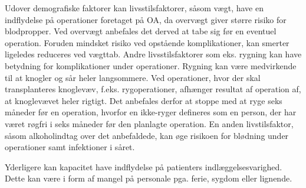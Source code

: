 Udover demografiske faktorer kan livsstilsfaktorer, såsom vægt, have en indflydelse på
operationer foretaget på OA, da overvægt giver større risiko
for blodpropper\cite{Ermonds2004}. Ved overvægt anbefales det derved at tabe sig før
en eventuel operation. Foruden mindsket risiko ved opstående komplikationer, kan
smerter ligeledes reduceres ved vægttab.
Andre livsstilsfaktorer som eks. rygning kan have betydning
for komplikationer under operationer. Rygning kan være medvirkende til at knogler
og sår heler langsommere. Ved operationer, hvor der skal transplanteres knoglevæv, f.eks. rygoperationer, afhænger resultat af operation af, at knoglevævet heler rigtigt.
Det anbefales derfor at stoppe med at ryge seks måneder før en operation, hvorfor en ikke-ryger defineres som en person, der har været røgfri i seks måneder før den planlagte
operation.\cite{Nordjylland2014} 
En anden livstilsfaktor, såsom alkoholindtag over det anbefaldede, kan øge risikoen for blødning under operationer samt infektioner i såret.\cite{Nordjylland2014}

Yderligere kan kapacitet have indflydelse på patienters indlæggelsesvarighed. Dette kan være i form af mangel på personale pga. ferie, sygdom eller lignende. 



